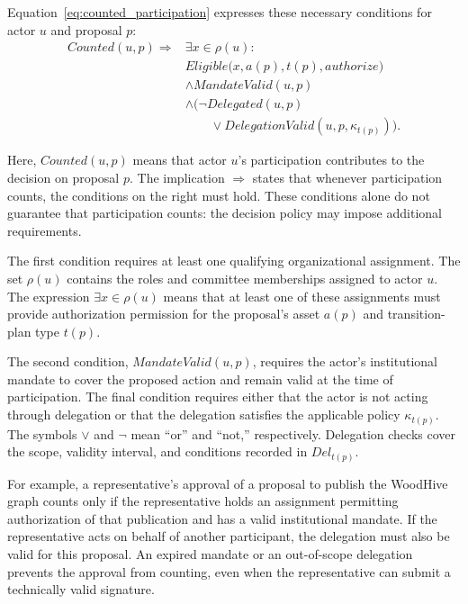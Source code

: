 \documentclass[journal]{IEEEtran}
\begin{document}
Equation~\ref{eq:counted_participation} expresses these necessary
conditions for actor $u$ and proposal $p$:
\begin{equation}
\label{eq:counted_participation}
\begin{aligned}
Counted(u,p)\Rightarrow{}&
\exists x\in\rho(u):\\
&Eligible\bigl(x,a(p),t(p),\mathit{authorize}\bigr)\\
&\land MandateValid(u,p)\\
&\land\bigl(\neg Delegated(u,p)\\
&\qquad\lor DelegationValid(u,p,\kappa_{t(p)})\bigr).
\end{aligned}
\end{equation}

Here, $Counted(u,p)$ means that actor $u$'s participation
contributes to the decision on proposal $p$. The implication
$\Rightarrow$ states that whenever participation counts, the
conditions on the right must hold. These conditions alone do
not guarantee that participation counts: the decision policy
may impose additional requirements.

The first condition requires at least one qualifying
organizational assignment. The set $\rho(u)$ contains the roles
and committee memberships assigned to actor $u$.
The expression $\exists x\in\rho(u)$ means that at least one
of these assignments must provide authorization permission
for the proposal's asset $a(p)$ and transition-plan type $t(p)$.

The second condition, $MandateValid(u,p)$, requires the actor's
institutional mandate to cover the proposed action and remain
valid at the time of participation. The final condition requires
either that the actor is not acting through delegation or that
the delegation satisfies the applicable policy $\kappa_{t(p)}$.
The symbols $\lor$ and $\neg$ mean ``or'' and ``not,''
respectively. Delegation checks cover the scope,
validity interval, and conditions recorded in $Del_{t(p)}$.

For example, a representative's approval of a proposal to publish
the WoodHive graph counts only if the representative holds an
assignment permitting authorization of that publication and has
a valid institutional mandate. If the representative acts on
behalf of another participant, the delegation must also be valid
for this proposal. An expired mandate or an out-of-scope delegation
prevents the approval from counting, even when the representative
can submit a technically valid signature.
\end{document}

